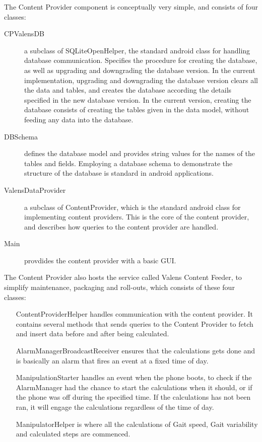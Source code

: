 The Content Provider component is conceptually very simple, and consists of four classes:
\begin{description}
\item[CPValensDB]
a subclass of SQLiteOpenHelper, the standard android class for handling database communication. Specifies the procedure for creating the database, as well as upgrading and downgrading the database version. In the current implementation, upgrading and downgrading the database version clears all the data and tables, and creates the database according the details specified in the new database version. In the current version, creating the database consists of creating the tables given in the data model, without feeding any data into the database.
\item[DBSchema]
defines the database model and provides string values for the names of the tables and fields. Employing a database schema to demonstrate the structure of the database is standard in android applications.
\item[ValensDataProvider]
a subclass of ContentProvider, which is the standard android class for implementing content providers. This is the core of the content provider, and describes how queries to the content provider are handled.
\item[Main]
provdides the content provider with a basic GUI.
\end{description}
\label{def:contentfeeder}
The Content Provider also hosts the service called Valens Content Feeder, to simplify maintenance, packaging and roll-outs, which consists of these four classes:
\begin{itemize}
\item[ContentProviderHelper] handles communication with the content provider. It contains several methods that sends queries to the Content Provider to fetch and insert data before and after being calculated.
\item[AlarmManagerBroadcastReceiver] ensures that the calculations gets done and is basically an alarm that fires an event at a fixed time of day.
\item[ManipulationStarter] handles an event when the phone boots, to check if the AlarmManager had the chance to start the calculations when it should, or if the phone was off during the specified time. If the calculations has not been ran, it will engage the calculations regardless of the time of day.
\item[ManipulatorHelper] is where all the calculations of Gait speed, Gait variability and calculated steps are commenced.
\end{itemize}

